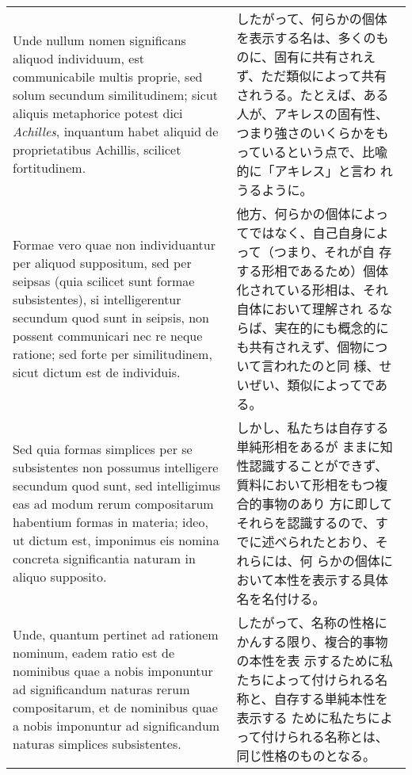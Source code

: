 \documentclass[10pt]{jsarticle} %
\begin{document}
\begin{longtable}{p{21em}p{21em}}
\\

Unde nullum nomen
significans aliquod individuum, est communicabile multis proprie, sed
solum secundum similitudinem; sicut aliquis metaphorice potest dici
{\itshape Achilles}, inquantum habet aliquid de proprietatibus
Achillis, scilicet fortitudinem.

&

したがって、何らかの個体を表示する名は、多くのものに、固有に共有されえ
ず、ただ類似によって共有されうる。たとえば、ある人が、アキレスの固有性、
つまり強さのいくらかをもっているという点で、比喩的に「アキレス」と言わ
れうるように。

\\


Formae vero quae non
individuantur per aliquod suppositum, sed per seipsas (quia scilicet
sunt formae subsistentes), si intelligerentur secundum quod sunt in
seipsis, non possent communicari nec re neque ratione; sed forte per
similitudinem, sicut dictum est de individuis. 

&

他方、何らかの個体によってではなく、自己自身によって（つまり、それが自
存する形相であるため）個体化されている形相は、それ自体において理解され
るならば、実在的にも概念的にも共有されえず、個物について言われたのと同
様、せいぜい、類似によってである。

\\

Sed quia formas simplices
per se subsistentes non possumus intelligere secundum quod sunt, sed
intelligimus eas ad modum rerum compositarum habentium formas in
materia; ideo, ut dictum est, imponimus eis nomina concreta
significantia naturam in aliquo supposito. 


&


しかし、私たちは自存する単純形相をあるが
 ままに知性認識することができず、質料において形相をもつ複合的事物のあり
 方に即してそれらを認識するので、すでに述べられたとおり、それらには、何
 らかの個体において本性を表示する具体名を名付ける。


\\


Unde, quantum pertinet ad
rationem nominum, eadem ratio est de nominibus quae a nobis imponuntur
ad significandum naturas rerum compositarum, et de nominibus quae a
nobis imponuntur ad significandum naturas simplices subsistentes. 

&


したがって、名称の性格にかんする限り、複合的事物の本性を表
 示するために私たちによって付けられる名称と、自存する単純本性を表示する
 ために私たちによって付けられる名称とは、同じ性格のものとなる。



\end{longtable}
\end{document}
